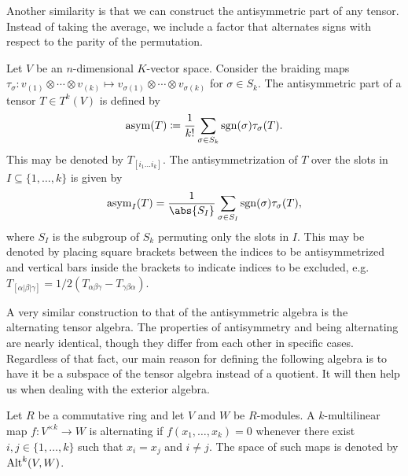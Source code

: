 \documentclass[a4paper,12pt]{article}
\begin{document}
Another similarity is that we can construct the antisymmetric part of any tensor.
Instead of taking the average, we include a factor that alternates signs with respect to the parity of the permutation.
\begin{definition}\label{def:tensor_antisymmetrization}
    Let $V$ be an $n$-dimensional $K$-vector space.
    Consider the braiding maps $\tau_\sigma \colon v_{(1)} \otimes \cdots \otimes v_{(k)} \mapsto v_{\sigma(1)} \otimes \cdots \otimes v_{\sigma(k)}$ for $\sigma \in S_k$.
    The antisymmetric part of a tensor $T \in T^k(V)$ is defined by
    \begin{equation}
        \operatorname{asym}(T) \coloneq \frac{1}{k!} \sum_{\sigma \in S_k} \operatorname{sgn}(\sigma) \tau_\sigma(T).
    \end{equation}
    This may be denoted by $T_{[i_1 \ldots i_k]}$.
    The antisymmetrization of $T$ over the slots in $I \subseteq \{1, \ldots, k\}$ is given by
    \begin{equation}
        \asym_I(T) = \frac{1}{\abs{S_I}} \sum_{\sigma \in S_I} \sgn(\sigma) \tau_\sigma(T),
    \end{equation}
    where $S_I$ is the subgroup of $S_k$ permuting only the slots in $I$.
    This may be denoted by placing square brackets between the indices to be antisymmetrized and vertical bars inside the brackets to indicate indices to be excluded, e.g. $T_{[\alpha \lvert\beta\rvert \gamma]} = 1/2 (T_{\alpha \beta \gamma} - T_{\gamma \beta \alpha})$.
\end{definition}
A very similar construction to that of the antisymmetric algebra is the alternating tensor algebra.
The properties of antisymmetry and being alternating are nearly identical, though they differ from each other in specific cases.
Regardless of that fact, our main reason for defining the following algebra is to have it be a subspace of the tensor algebra instead of a quotient.
It will then help us when dealing with the exterior algebra.
\begin{definition}\label{def:alternating_multilinear_map}
    Let $R$ be a commutative ring and let $V$ and $W$ be $R$-modules.
    A $k$-multilinear map $f \colon V^{\times k} \to W$ is alternating if $f(x_1, \ldots, x_k) = 0$ whenever there exist $i, j \in \{1, \ldots, k\}$ such that $x_i = x_j$ and $i \neq j$.
    The space of such maps is denoted by $\operatorname{Alt}^k(V, W)$.
\end{definition}
\end{document}
